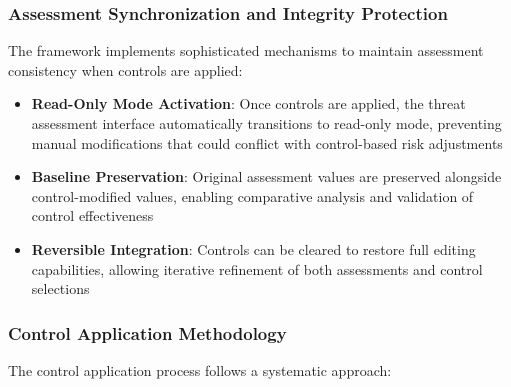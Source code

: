 \documentclass[binding=0.6cm]{sapthesis}
\begin{document}
\subsubsection{Assessment Synchronization and Integrity Protection}

The framework implements sophisticated mechanisms to maintain assessment consistency when controls are applied:

\begin{itemize}
\item \textbf{Read-Only Mode Activation}: Once controls are applied, the threat assessment interface automatically transitions to read-only mode, preventing manual modifications that could conflict with control-based risk adjustments
\item \textbf{Baseline Preservation}: Original assessment values are preserved alongside control-modified values, enabling comparative analysis and validation of control effectiveness
\item \textbf{Reversible Integration}: Controls can be cleared to restore full editing capabilities, allowing iterative refinement of both assessments and control selections
\end{itemize}

\subsubsection{Control Application Methodology}

The control application process follows a systematic approach:
\end{document}
